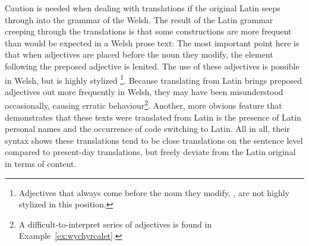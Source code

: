 Caution is needed when dealing with translations if the  original Latin seeps through into the grammar of the Welsh.
The result of the Latin grammar creeping through the translations is that some constructions are more frequent than would be expected in a Welsh prose text:
The most important point here is that when adjectives are placed before the noun they modify, the element following the preposed adjective is lenited.
The use of these adjectives is possible in Welsh, but is highly stylized%
\footnote{Adjectives that always come before the noun they modify, \eg {}, are not highly stylized in this position.}.
Because translating from Latin brings preposed adjectives out more frequently in Welsh, they may have been misunderstood occasionally, causing erratic behaviour\footnote{A difficult-to-interpret series of adjectives is found in Example~\ref{ex:wychyrcalet}.}.
Another, more obvious feature that demonstrates that  these texts were translated from Latin is the presence of Latin personal names and the occurrence of code switching to Latin.  
All in all, their syntax shows these translations tend to be close translations on the sentence level compared to present-day translations, but freely deviate from the Latin original in terms of content. 

